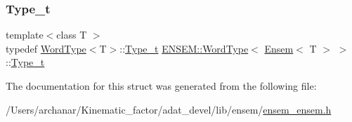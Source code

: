 \mbox{\label{structENSEM_1_1WordType_3_01Ensem_3_01T_01_4_01_4_af525fac697967b39c1ab3356734aeed7}} 
\subsubsection{\texorpdfstring{Type\_t}{Type\_t}\hspace{0.1cm}{\footnotesize\ttfamily [2/2]}}
{\footnotesize\ttfamily template$<$class T $>$ \\
typedef \mbox{\hyperlink{structENSEM_1_1WordType}{Word\+Type}}$<$T$>$\+::\mbox{\hyperlink{structENSEM_1_1WordType_3_01Ensem_3_01T_01_4_01_4_af525fac697967b39c1ab3356734aeed7}{Type\+\_\+t}} \mbox{\hyperlink{structENSEM_1_1WordType}{E\+N\+S\+E\+M\+::\+Word\+Type}}$<$ \mbox{\hyperlink{classENSEM_1_1Ensem}{Ensem}}$<$ T $>$ $>$\+::\mbox{\hyperlink{structENSEM_1_1WordType_3_01Ensem_3_01T_01_4_01_4_af525fac697967b39c1ab3356734aeed7}{Type\+\_\+t}}}



The documentation for this struct was generated from the following file\+:\begin{DoxyCompactItemize}
\item 
/\+Users/archanar/\+Kinematic\+\_\+factor/adat\+\_\+devel/lib/ensem/\mbox{\hyperlink{lib_2ensem_2ensem__ensem_8h}{ensem\+\_\+ensem.\+h}}\end{DoxyCompactItemize}
